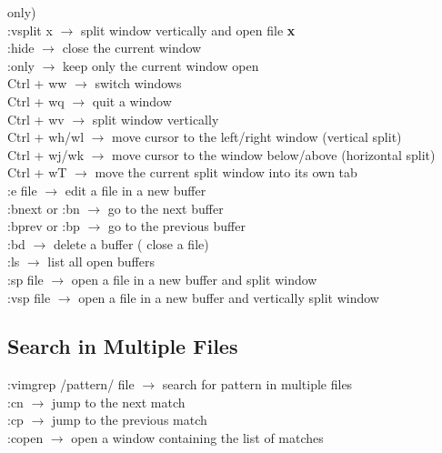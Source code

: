 \documentclass[twoside,a4paper]{article}
\newcommand{\tcb}{\color{blue}}
\newcommand{\tcc}{\color{cyan}}
\newcommand{\tcr}{\color{red}}
\newcommand{\tck}{\color{black}}
\newcommand{\ra }{$\rightarrow$ }
\begin{document}
\begin{multicols}{2}
    only)\\
    \tcr :vsplit x \tck \ra split window
    vertically and open file \textbf{x}\\
    \tcr :hide \tck \ra close the current
    window\\
    \tcr :only \tck \ra keep only the
    current window open\\
    \tcr Ctrl + ww \tck \ra switch windows\\
    \tcr Ctrl + wq \tck \ra quit a window\\
    \tcr Ctrl + wv \tck \ra split window
    vertically\\
    \tcr Ctrl + wh/wl \tck \ra move cursor
    to the left/right window (vertical split)\\
    \tcr Ctrl + wj/wk \tck \ra move cursor
    to the window below/above (horizontal split)\\
    \tcr Ctrl + wT \tck \ra move the
    current split window into its own tab\\
    \tcr :e \tcb  file \tck \ra edit
    a file in a new buffer\\
    \tcr :bnext or :bn \tck \ra go to the
    next buffer\\
    \tcr :bprev or :bp \tck \ra go to the
    previous buffer\\
    \tcr :bd \tck \ra delete a buffer (
    close a file)\\
    \tcr :ls \tck \ra list all open
    buffers\\
    \tcr :sp \tcb  file \tck \ra
    open a file in a new buffer and split window\\
    \tcr :vsp \tcb  file \tck $\rightarrow$
    open a file in a new buffer and vertically split window\\

    \vfill \null

    \vspace{-1 cm}
    \tcc \subsection{Search in Multiple Files}

    \tcr :vimgrep /pattern/ {file} \tck $\rightarrow$
    search for pattern in multiple files\\
    \tcr :cn \tck \ra jump to the next
    match\\
    \tcr :cp \tck \ra jump to the previous
    match\\
    \tcr :copen \tck \ra open a window
    containing the list of matches


\end{multicols}
\end{document}
